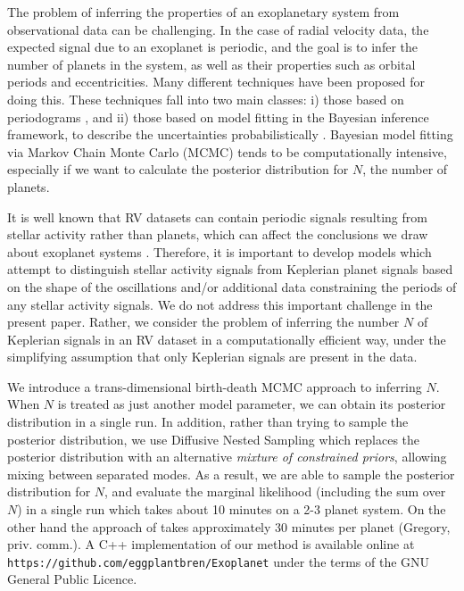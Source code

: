 \documentclass[useAMS,usenatbib]{mn2e}
\begin{document}
The problem of inferring the properties of an
exoplanetary system from observational data can be challenging.
In the case of radial velocity data,
the expected signal due to an exoplanet is periodic, and the goal is to
infer the number of planets in the system, as well as their properties such
as orbital periods and eccentricities. Many
different techniques have been proposed for doing this.
These techniques fall into two main
classes: i) those based on periodograms \citep[e.g.][]{2009A&A...496..577Z},
and ii) those based on model fitting in the Bayesian inference framework,
to describe the uncertainties probabilistically
\citep[e.g.][]{2011MNRAS.410...94G, 2014MNRAS.437.3540F,
2011A&A...528L...5T, fengji}. Bayesian model fitting via Markov Chain Monte
Carlo (MCMC) tends to be computationally intensive, especially if we
want to calculate the posterior distribution for $N$, the number of planets.

It is well known that RV datasets can contain periodic signals
resulting from stellar activity rather than planets,
which can affect the conclusions we draw about
exoplanet systems \citep[e.g.][]{2001A&A...379..279Q, 2007A&A...474..293B, 2014Sci...345..440R}.
Therefore, it is important to develop models which attempt to distinguish
stellar activity signals from Keplerian planet signals based on the shape of
the oscillations and/or additional data constraining the periods of any
stellar activity signals. We do not address this important challenge in the
present paper. Rather, we consider the problem of inferring the number $N$ of
Keplerian signals in an RV dataset in a computationally efficient way, under
the simplifying assumption that only Keplerian signals are present in the data.

We introduce a trans-dimensional birth-death MCMC approach
\citep{birthdeath} to inferring $N$.
When $N$ is treated as just another model parameter, we can obtain its
posterior distribution in a single run.
In addition, rather than trying to sample the posterior distribution, 
we use Diffusive Nested Sampling
\citep[DNS][]{dnest} which replaces the posterior distribution with an alternative
{\it mixture of constrained priors}, allowing mixing between separated modes.
As a result, we are able to sample the posterior distribution for $N$, and
evaluate the marginal likelihood (including the sum over $N$) in
a single run which takes about 10 minutes on a 2-3 planet system.
On the other hand the approach of
\citet{2011MNRAS.410...94G} takes approximately 30 minutes per planet
(Gregory, priv. comm.). A C++ implementation of our method is available online
at {\tt https://github.com/eggplantbren/Exoplanet} under the terms of the
GNU General Public Licence.
\end{document}
